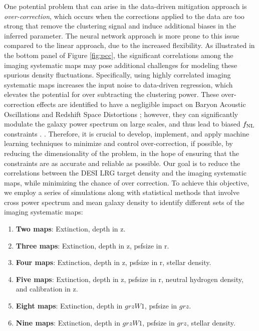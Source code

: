 One potential problem that can arise in the data-driven mitigation approach is \textit{over-correction}, which occurs when the corrections applied to the data are too strong that remove the clustering signal and induce additional biases in the inferred parameter. The neural network approach is more prone to this issue compared to the linear approach, due to the increased flexibility. As illustrated in the bottom panel of Figure \ref{fig:pcc}, the significant correlations among the imaging systematic maps may pose additional challenges for modeling these spurious density fluctuations. Specifically, using highly correlated imaging systematic maps increases the input noise to data-driven regression, which elevates the potential for over subtracting the clustering power. These over-correction effects are identified to have a negligible impact on Baryon Acoustic Oscillations and Redshift Space Distortions \citep{merz2021clustering}; however, they can significantly modulate the galaxy power spectrum on large scales, and thus lead to biased $f_{\rm NL}$ constraints \citep{rezaie2021primordial, mueller2022primordial}. . Therefore, it is crucial to develop, implement, and apply machine learning techniques to minimize and control over-correction, if possible, by reducing the dimensionality of the problem, in the hope of ensuring that the constraints are as accurate and reliable as possible. Our goal is to reduce the correlations between the DESI LRG target density and the imaging systematic maps, while minimizing the chance of over correction.  To achieve this objective, we employ a series of simulations along with statistical methods that involve cross power spectrum and mean galaxy density to identify different sets of the imaging systematic maps: 
\begin{enumerate}[itemindent=*]
\item \textbf{Two maps}: Extinction, depth in z.
\item \textbf{Three maps}: Extinction, depth in z, psfsize in r.
\item \textbf{Four maps}: Extinction, depth in z, psfsize in r, stellar density.
\item \textbf{Five maps}: Extinction, depth in z, psfsize in r, neutral hydrogen density, and calibration in z.
\item \textbf{Eight maps}: Extinction, depth in $grzW1$, psfsize in $grz$.
\item \textbf{Nine maps}: Extinction, depth in $grzW1$, psfsize in $grz$, stellar density.
\end{enumerate}

